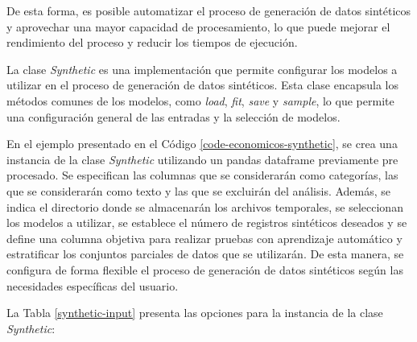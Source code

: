 De esta forma, es posible automatizar el proceso de generación de datos sintéticos y aprovechar una mayor capacidad de procesamiento, lo que puede mejorar el rendimiento del proceso y reducir los tiempos de ejecución.

La clase \emph{Synthetic} es una implementación que permite configurar los modelos a utilizar en el proceso de generación de datos sintéticos. Esta clase encapsula los métodos comunes de los modelos, como \emph{load}, \emph{fit}, \emph{save} y \emph{sample}, lo que permite una configuración general de las entradas y la selección de modelos.


En el ejemplo presentado en el Código \ref{code-economicos-synthetic}, se crea una instancia de la clase \emph{Synthetic} utilizando un pandas dataframe previamente pre procesado. Se especifican las columnas que se considerarán como categorías, las que se considerarán como texto y las que se excluirán del análisis. Además, se indica el directorio donde se almacenarán los archivos temporales, se seleccionan los modelos a utilizar, se establece el número de registros sintéticos deseados y se define una columna objetiva para realizar pruebas con aprendizaje automático y estratificar los conjuntos parciales de datos que se utilizarán. De esta manera, se configura de forma flexible el proceso de generación de datos sintéticos según las necesidades específicas del usuario.


La Tabla \ref{synthetic-input} presenta las opciones para la instancia de la clase \emph{Synthetic}:


